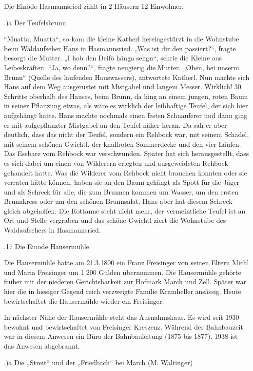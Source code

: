 \documentclass{book}
\begin{document}
Die Einöde Hasmannsried zählt in 2 Häusern 12 Einwohner.

.)a Der Teufelsbrunn

“Muatta, Muatta“, so kam die kleine Katherl hereingestürzt in die Wohnstube beim
Waldaufseher Hans in Hasmannsried. „Was ist dir den passiert?“, fragte besorgt
die Mutter. „I hob den Deifö hänga sehgn“, schrie die Kleine aus Leibeskräften.
“Ja, wo denn?“, fragte neugierig die Mutter. „Oben, bei unserm Brunn“ (Quelle
des laufenden Hauswassers), antwortete Katherl. Nun machte sich Hans auf dem Weg
ausgerüstet mit Mistgabel und langem Messer. Wirklich! 30 Schritte oberhalb des
Hauses, beim Brunn, da hing an einem jungen, roten Baum in seiner Pflanzung
etwas, als wäre es wirklich der leibhaftige Teufel, der sich hier aufgehängt
hätte. Hans machte nochmals einen festen Schnauferer und dann ging er mit
aufgepflanzter Mistgabel an den Teufel näher heran. Da sah er aber deutlich,
dass das nicht der Teufel, sondern ein Rehbock war, mit seinem Schädel, mit
seinem schönen Gwichtl, der knallroten Sommerdecke und den vier Läufen. Das
Essbare vom Rehbock war verschwunden. Später hat sich herausgestellt, dass es
sich dabei um einen von Wilderern erlegten und ausgeweideten Rehbock gehandelt
hatte. Was die Wilderer vom Rehbock nicht brauchen konnten oder sie verraten
hätte können, haben sie an den Baum gehängt als Spott für die Jäger und als
Schreck für alle, die zum Brunnen kommen um Wasser, um den ersten Brunnkress
oder um den schönen Brunnsalat, Hans aber hat diesem Schreck gleich abgeholfen.
Die Rottanne steht nicht mehr, der vermeintliche Teufel ist an Ort und Stelle
vergraben und das schöne Gwichtl ziert die Wohnstube des Waldaufsehers in
Hasmannsried.

.17 Die Einöde Hausermühle

Die Hausermühle hatte am 21.3.1800 ein Franz Freisinger von seinen Eltern Michl
und Maria Freisinger um 1 200 Gulden übernommen. Die Hausermühle gehörte früher
mit der niederen Gerichtsbarkeit zur Hofmark March und Zell. Später war hier die
in hiesiger Gegend reich verzweigte Familie Kramheller ansässig. Heute
bewirtschaftet die Hausermühle wieder ein Freisinger.

In nächster Nähe der Hausermühle steht das Ausnahmshaus. Es wird seit 1930
bewohnt und bewirtschaftet von Freisinger Kreszenz. Während der Bahnbauzeit war
in diesem Anwesen ein Büro der Bahnbauleitung (1875 bis 1877). 1938 ist das
Anwesen abgebrannt.

.)a Die „Streit“ und der „Friedbach“ bei March (M. Waltinger)
\end{document}
